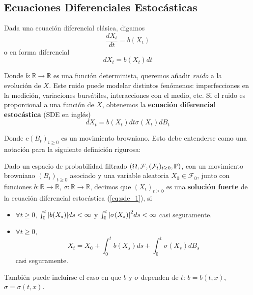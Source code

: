\subsection{Ecuaciones Diferenciales Estocásticas}
Dada una ecuación diferencial clásica, digamos 
\begin{equation*}
        \frac{dX_t}{dt} = b(X_t)
\end{equation*}
o en forma diferencial 
\begin{equation*}
        dX_t = b(X_t) dt
\end{equation*}

Donde $b: \mathbb{R} \to \mathbb{R}$ es una función determinista, queremos añadir \textit{ruido} a la evolución 
de $X$. Este ruido puede modelar distintos fenómenos: imperfecciones en la medición, variaciones 
bursátiles, interacciones con el medio, etc. Si el ruido es proporcional a una función de $X$, obtenemos 
la \textbf{ecuación diferencial estocástica} (SDE en inglés)
\begin{equation*}
        \label{eq:sde_1}
        \tag{*}
        dX_t = b(X_t) dt \sigma (X_t) dB_t
\end{equation*}

Donde e$(B_t)_{t \ge  0}$ es un movimiento browniano. Esto debe entenderse como una notación para 
la siguiente definición rigurosa:
 \begin{definition}
         Dado un espacio de probabilidad filtrado $(\Omega, \mathcal{F},(\mathcal{F}_t)_{t \geq 0}, \P)$, 
         con un movimiento browniano $(B_t)_{t \ge 0}$ asociado y una variable
         aleatoria $X_0 \in \mathcal{F}_0$, junto con funciones $b: \mathbb{R} \to \mathbb{R}$, $\sigma: \mathbb{R} \to \mathbb{R}$, 
         decimos que $(X_t)_{t \ge 0}$ es una \textbf{solución fuerte} de la ecuación diferencial estocástica
         (\ref{eq:sde_1}), si 
         \begin{itemize}
                 \item $\forall  t \ge  0$, $\int_{0}^{t} \abs{b(X_s)} ds < \infty$ y 
                         $\int_{0}^{t} \abs{\sigma (X_s)}^2 ds < \infty$ casi seguramente.
                 \item $\forall  t \ge 0$,
                         \begin{equation*}
                                 \label{eq:sde_2}
                                 \tag{**}
                                 X_t = X_0 + \int_{0}^{t} b(X_s) ds  + \int_{0}^{t} \sigma (X_s) dB_s 
                         \end{equation*}
                         casi seguramente. 
         \end{itemize}
 \end{definition}
\begin{remark}
        También puede incluirse el caso en que $b$ y $\sigma$ dependen de $t$: $b = b(t,x)$, 
        $\sigma = \sigma(t,x)$. 
\end{remark}

